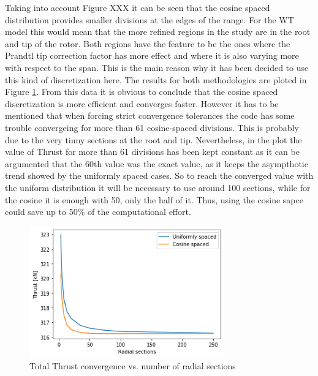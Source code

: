 Taking into account Figure XXX it can be seen that the cosine spaced distribution provides smaller divisions at the edges of the range. For the WT model this would mean that the more refined regions in the study are in the root and tip of the rotor. Both regions have the feature to be the ones where the Prandtl tip correction factor has more effect and where it is also varying more with respect to the span. This is the main reason why it has been decided to use this kind of discretization here. The results for both methodologies are ploted in Figure \ref{thrust_conv_alligned}. From this data it is obvious to conclude that the cosine spaced discretization is more efficient and converges faster. However it has to be mentioned that when forcing strict convergence tolerances the code has some trouble convergeing for more than 61 cosine-spaced divisions. This is probably due to the very tinny sections at the root and tip. Nevertheless, in the plot the value of Thrust for more than 61 divisions has been kept constant as it can be argumented that the 60th value was the exact value, as it keeps the asympthotic trend showed by the uniformly spaced cases. So to reach the converged value with the uniform distribution it will be necessary to use around 100 sections, while for the cosine it is enough with 50, only the half of it. Thus, using the cosine sapce could save up to 50$\%$ of the computational effort. 

\begin{figure}[htbp]
\includegraphics[width=0.75\textwidth]{./img/Thrust_convergence_plt.png}
\caption{Total Thrust convergence vs. number of radial sections}
\centering
\label{thrust_conv_alligned}
\end{figure}

